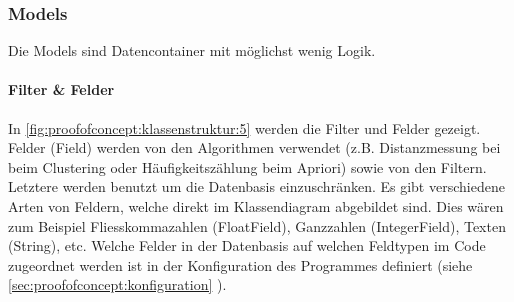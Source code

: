 \subsubsection{Models}
\label{sec:proofofconcept:klassenstruktur:models}
Die Models sind Datencontainer mit möglichst wenig Logik. 

\paragraph{Filter \& Felder} In \cref{fig:proofofconcept:klassenstruktur:5} werden die Filter und Felder gezeigt. Felder (Field) werden von den Algorithmen verwendet (z.B. Distanzmessung bei beim Clustering oder Häufigkeitszählung beim Apriori) sowie von den Filtern. Letztere werden benutzt um die Datenbasis einzuschränken. Es gibt verschiedene Arten von Feldern, welche direkt im Klassendiagram abgebildet sind. Dies wären zum Beispiel Fliesskommazahlen (FloatField), Ganzzahlen (IntegerField), Texten (String), etc. Welche Felder in der Datenbasis auf welchen Feldtypen im Code zugeordnet werden ist in der Konfiguration des Programmes definiert (siehe \cref{sec:proofofconcept:konfiguration} ).

